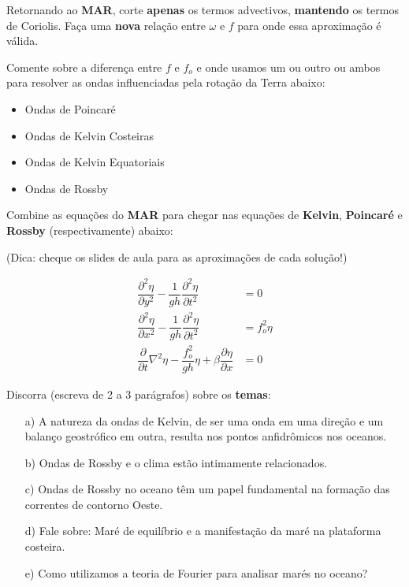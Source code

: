 \documentclass[letterpaper,portuguese,12pt,pdftex]{exam}
\begin{document}
\begin{questions}
\question[1]
Retornando ao {\bf MAR}, corte {\bf apenas} os termos advectivos, {\bf mantendo}
os termos de Coriolis.  Faça uma {\bf nova} relação entre $\omega$ e $f$ para
onde essa aproximação é válida.

\question[4]
Comente sobre a diferença entre $f$ e $f_o$ e onde usamos um ou outro ou ambos
para resolver as ondas influenciadas pela rotação da Terra abaixo:
\begin{itemize}
  \item Ondas de Poincaré
  \item Ondas de Kelvin Costeiras
  \item Ondas de Kelvin Equatoriais
  \item Ondas de Rossby
\end{itemize}

Combine as equações do {\bf MAR} para chegar nas equações de {\bf Kelvin},
{\bf Poincaré} e {\bf Rossby} (respectivamente) abaixo:

(Dica: cheque os slides de aula para as aproximações de cada solução!)

\begin{align*}
  \dfrac{\partial^2\eta}{\partial y^2} - \dfrac{1}{gh}\dfrac{\partial^2\eta}{\partial{t^2}} &= 0 \\
  \dfrac{\partial^2\eta}{\partial x^2} - \dfrac{1}{gh}\dfrac{\partial^2\eta}{\partial t^2} &= f_o^2\eta \\
  \dfrac{\partial{}}{\partial t} \nabla^2 \eta - \dfrac{f_o^2}{gh} \eta + \beta \dfrac{\partial{\eta}}{\partial x} &= 0
\end{align*}

\question[5]
Discorra (escreva de 2 a 3 parágrafos) sobre os {\bf temas}:
\begin{itemize}
  \item[a)] A natureza da ondas de Kelvin, de ser uma onda em uma direção e um
        balanço geostrófico em outra, resulta nos pontos anfidrômicos nos
        oceanos.
  \item[b)] Ondas de Rossby e o clima estão intimamente relacionados.
  \item[c)] Ondas de Rossby no oceano têm um papel fundamental na formação das
        correntes de contorno Oeste.
  \item[d)] Fale sobre: Maré de equilíbrio e a manifestação da maré na
            plataforma costeira.
  \item[e)] Como utilizamos a teoria de Fourier para analisar marés no oceano?
\end{itemize}


\end{questions}
\end{document}

